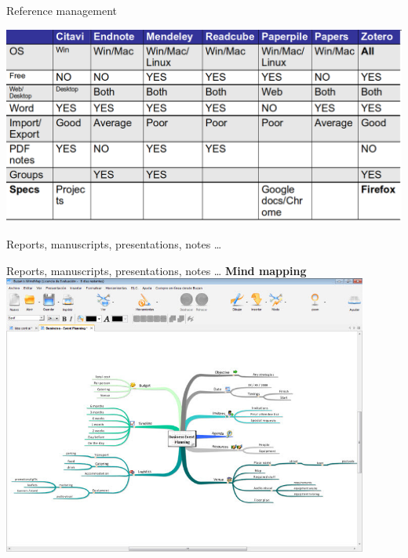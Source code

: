 \documentclass[10pt]{beamer}%
\begin{document}
\begin{frame}{Reference management}

\includegraphics[width=\textwidth]{Figures/comp}

\end{frame}

\begin{frame}{Reports, manuscripts, presentations, notes \dots}
 
\end{frame}


\begin{frame}{Reports, manuscripts, presentations, notes \dots}
\centering
\textbf{Mind mapping}
\includegraphics[width=0.9\textwidth]{Figures/mindmaps}
\end{frame}
\end{document}
